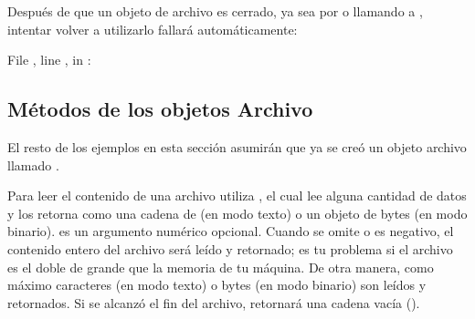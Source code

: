 \documentclass[a5paper,10pt,spanish]{sphinxmanual}
\begin{document}
\sphinxAtStartPar
Después de que un objeto de archivo es cerrado, ya sea por  o llamando a , intentar volver a utilizarlo fallará automáticamente:

\begin{sphinxVerbatim}[commandchars=\\\{\}]
  File , line , in 
: 
\end{sphinxVerbatim}


\subsection{Métodos de los objetos Archivo}
\label{\detokenize{tutorial/inputoutput:methods-of-file-objects}}\label{\detokenize{tutorial/inputoutput:tut-filemethods}}
\sphinxAtStartPar
El resto de los ejemplos en esta sección asumirán que ya se creó un objeto archivo llamado .

\sphinxAtStartPar
Para leer el contenido de una archivo utiliza , el cual lee alguna cantidad de datos y los retorna como una cadena de (en modo texto) o un objeto de bytes (en modo binario).  es un argumento numérico opcional.  Cuando se omite  o es negativo, el contenido entero del archivo será leído y retornado; es tu problema si el archivo es el doble de grande que la memoria de tu máquina.  De otra manera, como máximo  caracteres (en modo texto) o  bytes (en modo binario) son leídos y retornados. Si se alcanzó el fin del archivo,  retornará una cadena vacía ().

\begin{sphinxVerbatim}[commandchars=\\\{\}]
\end{sphinxVerbatim}
\end{document}

